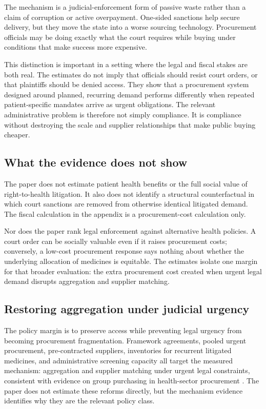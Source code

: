The mechanism is a judicial-enforcement form of passive waste rather
than a claim of corruption or active overpayment. One-sided sanctions
help secure delivery, but they move the state into a worse sourcing
technology. Procurement officials may be doing exactly what the court
requires while buying under conditions that make success more
expensive.

This distinction is important in a setting where the legal and fiscal
stakes are both real. The estimates do not imply that officials should
resist court orders, or that plaintiffs should be denied access. They
show that a procurement system designed around planned, recurring
demand performs differently when repeated patient-specific mandates
arrive as urgent obligations. The relevant administrative problem is
therefore not simply compliance. It is compliance without destroying
the scale and supplier relationships that make public buying cheaper.

\subsection{What the evidence does not show}
\label{subsec:limits}

The paper does not estimate patient health benefits or the full social
value of right-to-health litigation. It also does
not identify a structural counterfactual in which court sanctions are
removed from otherwise identical litigated demand. The fiscal
calculation in the appendix is a procurement-cost calculation only.

Nor does the paper rank legal enforcement against alternative health
policies. A court order can be socially valuable even if it raises
procurement costs; conversely, a low-cost procurement response says
nothing about whether the underlying allocation of medicines is
equitable. The estimates isolate one margin for that broader
evaluation: the extra procurement cost created when urgent legal
demand disrupts aggregation and supplier matching.

\subsection{Restoring aggregation under judicial urgency}
\label{subsec:policy_tools}

The policy margin is to preserve access while preventing legal
urgency from becoming procurement fragmentation. Framework
agreements, pooled urgent procurement, pre-contracted suppliers,
inventories for recurrent litigated medicines, and administrative
screening capacity all target the measured mechanism: aggregation and
supplier matching under urgent legal constraints, consistent with
evidence on group purchasing in health-sector procurement
\citep{lin2025value}. The paper does not
estimate these reforms directly, but the mechanism evidence identifies
why they are the relevant policy class.
